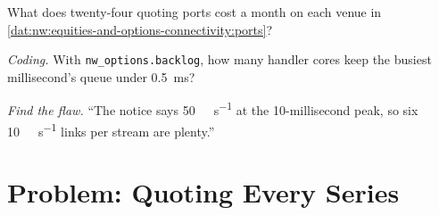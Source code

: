 \begin{exercise}[$\star\star$]\label{exo:nw:equities-and-options-connectivity:6}
What does twenty-four quoting ports cost a month on each venue in \cref{dat:nw:equities-and-options-connectivity:ports}?
\end{exercise}

\begin{exercise}[$\star\star\star$]\label{exo:nw:equities-and-options-connectivity:7}
\emph{Coding.} With \texttt{nw\_options.backlog}, how many handler cores keep the busiest millisecond's queue under
\qty{0.5}{\milli\second}?
\end{exercise}

\begin{exercise}[$\star\star\star$]\label{exo:nw:equities-and-options-connectivity:8}
\emph{Find the flaw.} ``The notice says \qty{50}{\giga\bit\per\second} at the 10-millisecond peak, so six
\qty{10}{\giga\bit\per\second} links per stream are plenty.''
\end{exercise}

\section{Problem: Quoting Every Series}

